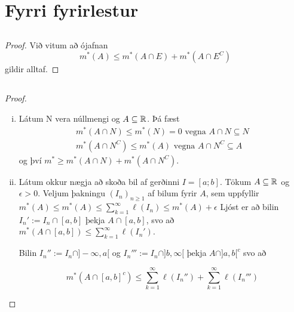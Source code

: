 \documentclass[12pt]{book}
\begin{document}
\section{Fyrri fyrirlestur}
\subsection{}
\begin{proof}
  Við vitum að ójafnan \[m^*(A) \leq m^*(A \cap E) + m^*(A \cap E^C) \]
  gildir alltaf.
  
\end{proof}

\subsection{}
\begin{proof}
  \begin{enumerate}[(i)]
  \item  Látum N vera núllmengi og $A \subseteq \mathbb{R}$. Þá fæst
    \begin{gather*}
      m^*(A\cap N) \leq m^*(N) = 0 \text{ vegna } A \cap N \subseteq N \\
      m^*(A \cap N^C) \leq m^*(A) \text{ vegna } A \cap N^C \subseteq A
    \end{gather*}
    og því $m^* \geq m^*(A \cap N) + m^*(A\cap N^C)$.


  \item Látum okkur nægja að skoða bil af gerðinni $I = [a;b]$. Tökum $A \subseteq \mathbb{R}$
    og $\epsilon > 0$. Veljum þakningu $(I_n)_{n\geq 1}$ af bilum fyrir $A$,
    sem uppfyllir $m^*(A) \leq m^*(A) \leq \sum_{k=1}^{\infty} \ell(I_n) \leq m^*(A) + \epsilon$
    Ljóst er að bilin $I_n' := I_n \cap [a,b]$ þekja $A \cap [a,b]$, svo að
    $m^*(A \cap [a,b]) \leq \sum_{k=1}^{\infty} \ell(I_n')$.

    Bilin $I_n'' := I_n \cap ]- \infty, a[$ og $I_n''' := I_n \cap ]b, \infty [ $
    þekja  $A \cap ]a,b[^c$ svo að

\[ m^*(A \cap [a,b]^c) \leq \sum_{k=1}^{\infty} \ell(I_n'') + \sum_{k=1}^{\infty} \ell(I_n''') \]
  \end{enumerate}
  
\end{proof}

\subsection{}
\end{document}
